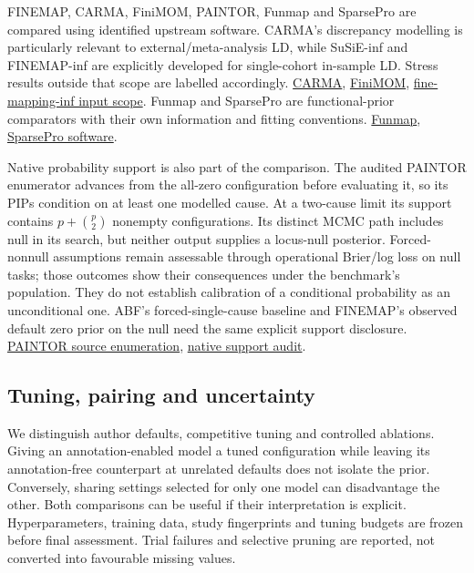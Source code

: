 \documentclass[
  british,
  10pt,
]{article}
\newcounter{none} %
\begin{document}
FINEMAP, CARMA, FiniMOM, PAINTOR, Funmap and SparsePro are compared
using identified upstream software. CARMA's discrepancy modelling is
particularly relevant to external/meta-analysis LD, while SuSiE-inf and
FINEMAP-inf are explicitly developed for single-cohort in-sample LD.
Stress results outside that scope are labelled accordingly.
\href{https://doi.org/10.1038/s41588-023-01392-0}{CARMA},
\href{https://doi.org/10.1093/bioinformatics/btad396}{FiniMOM},
\href{https://github.com/FinucaneLab/fine-mapping-inf}{fine-mapping-inf
input scope}. Funmap and SparsePro are functional-prior comparators with
their own information and fitting conventions.
\href{https://doi.org/10.1093/bioinformatics/btaf017}{Funmap},
\href{https://github.com/zhwm/SparsePro}{SparsePro software}.

Native probability support is also part of the comparison. The audited
PAINTOR enumerator advances from the all-zero configuration before
evaluating it, so its PIPs condition on at least one modelled cause. At
a two-cause limit its support contains \(p + {p\choose2}\) nonempty
configurations. Its distinct MCMC path includes null in its search, but
neither output supplies a locus-null posterior. Forced-nonnull
assumptions remain assessable through operational Brier/log loss on null
tasks; those outcomes show their consequences under the benchmark's
population. They do not establish calibration of a conditional
probability as an unconditional one. ABF's forced-single-cause baseline
and FINEMAP's observed default zero prior on the null need the same
explicit support disclosure.
\href{https://github.com/gkichaev/PAINTOR_V3.0/blob/ffce82a7114eeb98220db39ba5d6b69e5a419a9e/Functions_model.cpp\#L124-L151}{PAINTOR
source enumeration}, \href{../docs/paintor-native-contract.md}{native
support audit}.

\subsection{Tuning, pairing and
uncertainty}\label{tuning-pairing-and-uncertainty}

We distinguish author defaults, competitive tuning and controlled
ablations. Giving an annotation-enabled model a tuned configuration
while leaving its annotation-free counterpart at unrelated defaults does
not isolate the prior. Conversely, sharing settings selected for only
one model can disadvantage the other. Both comparisons can be useful if
their interpretation is explicit. Hyperparameters, training data, study
fingerprints and tuning budgets are frozen before final assessment.
Trial failures and selective pruning are reported, not converted into
favourable missing values.
\end{document}
